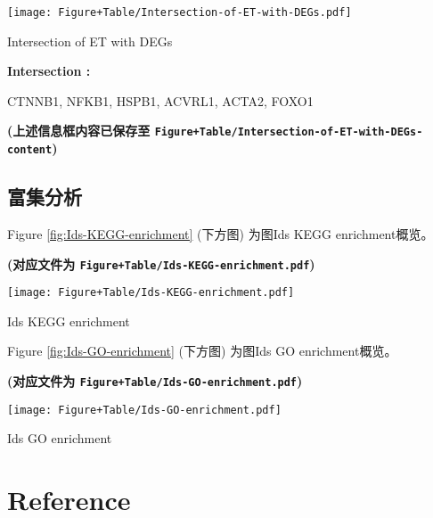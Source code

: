 \documentclass[
]{article}
\begin{document}
\def\@captype{figure}
\begin{center}
\texttt{[image: Figure+Table/Intersection-of-ET-with-DEGs.pdf]}
\caption{Intersection of ET with DEGs}\label{fig:Intersection-of-ET-with-DEGs}
\end{center}
\begin{center}\begin{tcolorbox}[colback=gray!10, colframe=gray!50, width=0.9\linewidth, arc=1mm, boxrule=0.5pt]
\textbf{
Intersection
:}

\vspace{0.5em}

    CTNNB1, NFKB1, HSPB1, ACVRL1, ACTA2, FOXO1

\vspace{2em}
\end{tcolorbox}
\end{center}

\textbf{(上述信息框内容已保存至 \texttt{Figure+Table/Intersection-of-ET-with-DEGs-content})}

\hypertarget{ux5bccux96c6ux5206ux6790}{%
\subsection{富集分析}\label{ux5bccux96c6ux5206ux6790}}

Figure \ref{fig:Ids-KEGG-enrichment} (下方图) 为图Ids KEGG enrichment概览。

\textbf{(对应文件为 \texttt{Figure+Table/Ids-KEGG-enrichment.pdf})}

\def\@captype{figure}
\begin{center}
\texttt{[image: Figure+Table/Ids-KEGG-enrichment.pdf]}
\caption{Ids KEGG enrichment}\label{fig:Ids-KEGG-enrichment}
\end{center}

Figure \ref{fig:Ids-GO-enrichment} (下方图) 为图Ids GO enrichment概览。

\textbf{(对应文件为 \texttt{Figure+Table/Ids-GO-enrichment.pdf})}

\def\@captype{figure}
\begin{center}
\texttt{[image: Figure+Table/Ids-GO-enrichment.pdf]}
\caption{Ids GO enrichment}\label{fig:Ids-GO-enrichment}
\end{center}

\hypertarget{bibliography}{%
\section*{Reference}\label{bibliography}}
\end{document}
